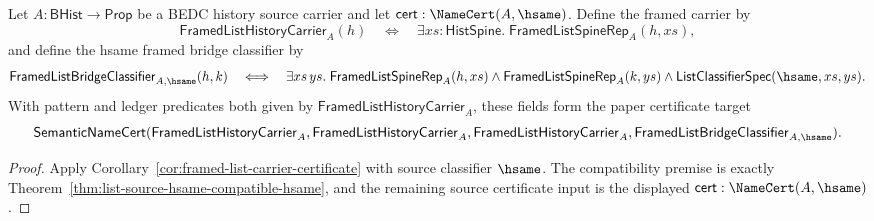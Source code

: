 \begin{corollary}
\label{cor:framed-list-carrier-certificate-hsame}
Let $A:\mathsf{BHist}\to\mathsf{Prop}$ be a BEDC history source carrier and let
$\mathsf{cert}:\NameCert(A,\hsame)$. Define the framed carrier by
$$
\mathsf{FramedListHistoryCarrier}_A(h)
\quad\Longleftrightarrow\quad
\exists xs:\mathsf{HistSpine}.\;\mathsf{FramedListSpineRep}_A(h,xs),
$$
and define the hsame framed bridge classifier by
$$
\mathsf{FramedListBridgeClassifier}_{A,\hsame}(h,k)
\quad\Longleftrightarrow\quad
\exists xs\,ys.\;
\mathsf{FramedListSpineRep}_A(h,xs)\land
\mathsf{FramedListSpineRep}_A(k,ys)\land
\mathsf{ListClassifierSpec}(\hsame,xs,ys).
$$
With pattern and ledger predicates both given by
$\mathsf{FramedListHistoryCarrier}_A$, these fields form the paper certificate
target
$$
\mathsf{SemanticNameCert}(\mathsf{FramedListHistoryCarrier}_A,
\mathsf{FramedListHistoryCarrier}_A,
\mathsf{FramedListHistoryCarrier}_A,
\mathsf{FramedListBridgeClassifier}_{A,\hsame}).
$$
\end{corollary}
\begin{proof}
Apply Corollary~\ref{cor:framed-list-carrier-certificate} with
source classifier $\hsame$. The compatibility premise is exactly
Theorem~\ref{thm:list-source-hsame-compatible-hsame}, and the remaining source
certificate input is the displayed $\mathsf{cert}:\NameCert(A,\hsame)$.
\end{proof}
